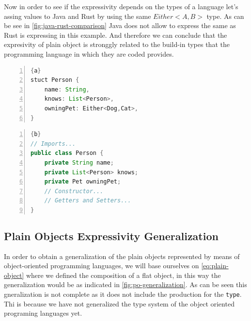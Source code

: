 Now in order to see if the expressivity depends on the types of a language let's assing values to Java and Rust by using the same
$Either<A,B>$ type. As can be see in \cref{fig:java-rust-comparison} Java does not allow to express the same as Rust is expressing
in this example. And therefore we can conclude that the expresivity of plain object is stronggly related to the build-in types that
the programming language in which they are coded provides.

\begin{center}
	\noindent\begin{minipage}[t]{.4\textwidth}
        \begin{lstlisting}[language=Java,frame=topline,numbers=left,title=\scriptsize{Person Rust Struct},
            basicstyle=\ttfamily\scriptsize]{a}
stuct Person {
    name: String,
    knows: List<Person>,
    owningPet: Either<Dog,Cat>,
}
		\end{lstlisting}
	\end{minipage}\hfill
	\begin{minipage}[t]{.5\textwidth}
        \begin{lstlisting}[language=Java, frame=t,numbers=left,title=\scriptsize{Person Java Object},
            basicstyle=\ttfamily\scriptsize]{b}
// Imports...
public class Person {
    private String name;
    private List<Person> knows;
    private Pet owningPet;
    // Constructor...
    // Getters and Setters...
}
		\end{lstlisting}
	\end{minipage}
	\label{fig:java-rust-comparison}
\end{center}


\subsection{Plain Objects Expressivity Generalization}
In order to obtain a generalization of the plain objects represented by means of object-oriented programming languages,
we will base ourselves on \cref{eq:plain-object} where we defined the composition of a flat object, in this way the
generalization would be as indicated in \cref{fig:po-generalization}. As can be seen this gneralization is not complete
as it does not include the production for the \texttt{type}. Thi is because we have not generalized the type system of the
object oriented programing languages yet.

